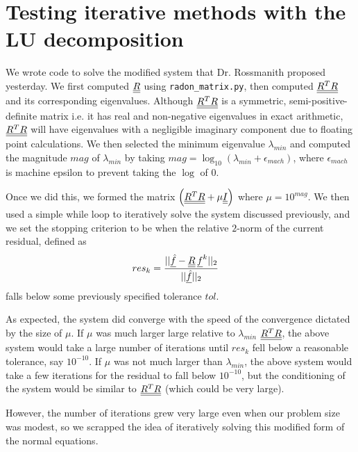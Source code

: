 
\section*{Testing iterative methods with the LU decomposition}
We wrote code to solve the modified system that Dr. Rossmanith proposed yesterday.
We first computed ${\underline{\underline{R}}}$ using \verb|radon_matrix.py|, then computed ${\underline{\underline{R^{T} R}}}$ and its corresponding eigenvalues.
Although ${\underline{\underline{R^{T} R}}}$ is a symmetric, semi-positive-definite matrix i.e. it has real and non-negative eigenvalues in exact arithmetic, ${\underline{\underline{R^{T} R}}}$ will have eigenvalues with a negligible imaginary component due to floating point calculations.
We then selected the minimum eigenvalue $\lambda_{min}$ and computed the magnitude $mag$ of $\lambda_{min}$ by taking $mag = \log_{10} (\lambda_{min} + \epsilon_{mach})$, where $\epsilon_{mach}$ is machine epsilon to prevent taking the $\log$ of $0$.
\par 
Once we did this, we formed the matrix $\Big( {\underline{\underline{R^{T} R}}} + \mu {\underline{\underline{I}}} \Big)$ where $\mu = 10^{mag}$.
We then used a simple while loop to iteratively solve the system discussed previously, and we set the stopping criterion to be when the relative $2$-norm of the current residual, defined as
\begin{align*}
	res_{k} & = \frac{||{\underline{\hat{f}}} - {\underline{\underline{R}}} \, {\underline{f}}^{k}||_{2}}{||{\underline{\hat{f}}}||_{2}}
\end{align*}
falls below some previously specified tolerance $tol$.
\par 
As expected, the system did converge with the speed of the convergence dictated by the size of $\mu$.
If $\mu$ was much larger large relative to $\lambda_{min}$ ${\underline{\underline{R^{T} R}}}$, the above system would take a large number of iterations until $res_{k}$ fell below a reasonable tolerance, say $10^{-10}$.
If $\mu$ was not much larger than $\lambda_{min}$, the above system would take a few iterations for the residual to fall below $10^{-10}$, but the conditioning of the system would be similar to ${\underline{\underline{R^{T} R}}}$ (which could be very large).
\par 
However, the number of iterations grew very large even when our problem size was modest, so we scrapped the idea of iteratively solving this modified form of the normal equations.